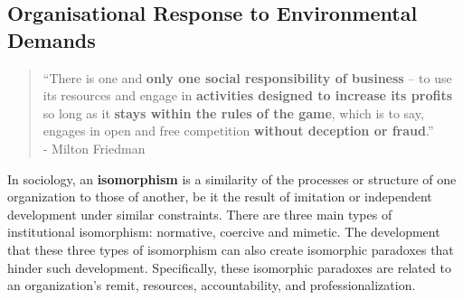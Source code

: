 \documentclass[11pt]{article}
\theoremstyle{definition}
\begin{document}
\subsection{Organisational Response to Environmental Demands}

\begin{quote}
	\textquotedblleft There is one and \textbf{only one social responsibility of business} -- to use its resources and engage in \textbf{activities designed to increase its profits} so long as it \textbf{stays within the rules of the game}, which is to say, engages in open and free competition \textbf{without deception or fraud}.\textquotedblright\\
	\hspace*{1em} - Milton Friedman
\end{quote}

\begin{definition}
	In sociology, an \textbf{isomorphism} is a similarity of the processes or structure of one organization to those of another, be it the result of imitation or independent development under similar constraints. There are three main types of institutional isomorphism: normative, coercive and mimetic. The development that these three types of isomorphism can also create isomorphic paradoxes that hinder such development. Specifically, these isomorphic paradoxes are related to an organization's remit, resources, accountability, and professionalization.
\end{definition}
\end{document}
